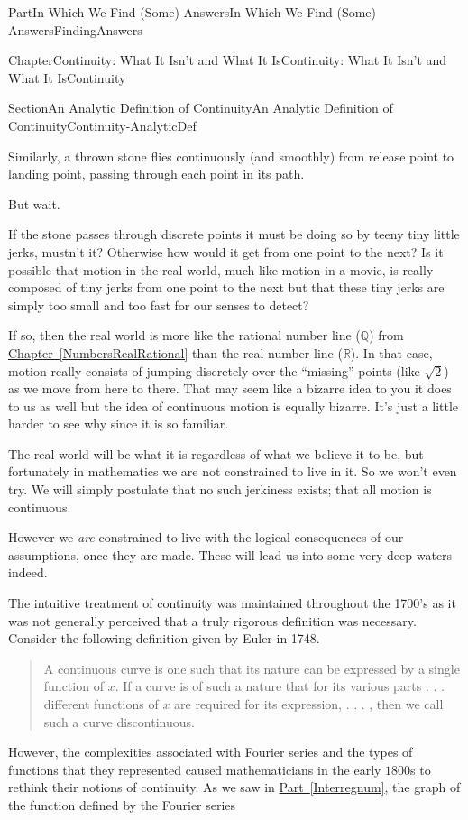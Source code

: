 \documentclass[oneside,10pt,]{book}
\newcommand{\xreffont}{\relax}
\numberwithin{equation}{part}
\newcommand{\RR}{\mathbb {R}}
\newcommand{\QQ}{\mathbb {Q}}
\begin{document}
\begin{partptx}{Part}{In Which We Find (Some) Answers}{}{In Which We Find (Some) Answers}{}{}{FindingAnswers}
\begin{chapterptx}{Chapter}{Continuity: What It Isn't and What It Is}{}{Continuity: What It Isn't and What It Is}{}{}{Continuity}
\begin{sectionptx}{Section}{An Analytic Definition of Continuity}{}{An Analytic Definition of Continuity}{}{}{Continuity-AnalyticDef}
\par
Similarly, a thrown stone flies continuously (and smoothly) from release point to landing point, passing through each point in its path.%
\par
But wait.%
\par
If the stone passes through discrete points it must be doing so by teeny tiny little jerks, mustn't it?  Otherwise how would it get from one point to the next?  Is it possible that motion in the real world, much like motion in a movie, is really composed of tiny jerks from one point to the next but that these tiny jerks are simply too small and too fast for our senses to detect?%
\par
If so, then the real world is more like the rational number line (\(\QQ\)) from \hyperref[NumbersRealRational]{Chapter~{\xreffont\ref{NumbersRealRational}}} than the real number line (\(\RR\)).  In that case, motion really consists of jumping discretely over the ``missing'' points (like \(\sqrt{2}\)) as we move from here to there. That may seem like a bizarre idea to you \textemdash{} it does to us as well \textemdash{} but the idea of continuous motion is equally bizarre.  It's just a little harder to see why since it is so familiar.%
\par
The real world will be what it is regardless of what we believe it to be, but fortunately in mathematics we are not constrained to live in it.  So we won't even try.  We will simply postulate that no such jerkiness exists; that all motion is continuous.%
\par
However we \emph{are} constrained to live with the logical consequences of our assumptions, once they are made.  These will lead us into some very deep waters indeed.%
\par
The intuitive treatment of continuity was maintained throughout the 1700's as it was not generally perceived that a truly rigorous definition was necessary.  Consider the following definition given by Euler in 1748.%
\begin{quote}%
A continuous curve is one such that its nature can be expressed by a single function of \(x.\) If a curve is of such a nature that for its various parts . . . different functions of \(x\) are required for its expression, . . . , then we call such a curve discontinuous.%
\end{quote}
However, the complexities associated with Fourier series and the types of functions that they represented caused mathematicians in the early \(1800\)s to rethink their notions of continuity.  As we saw in \hyperref[Interregnum]{Part~{\xreffont\ref{Interregnum}}}, the graph of the function defined by the Fourier series%

\end{sectionptx}
\end{chapterptx}
\end{partptx}
\end{document}
